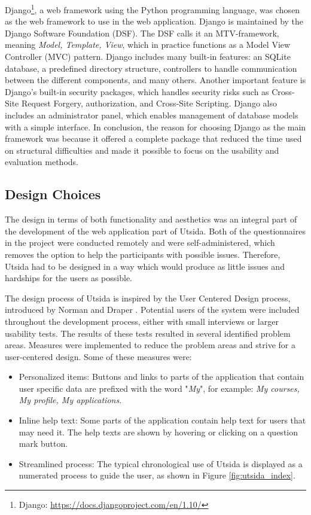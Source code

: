 Django\footnote{Django: \url{https://docs.djangoproject.com/en/1.10/}}, a web framework using the Python programming language, was chosen as the web framework to use in the web application. Django is maintained by the Django Software Foundation (DSF). The DSF calls it an MTV-framework, meaning \emph{Model, Template, View}, which in practice functions as a Model View Controller (MVC) pattern. Django includes many built-in features: an SQLite database, a predefined directory structure, controllers to handle communication between the different components, and many others. Another important feature is Django's built-in security packages, which handles security risks such as Cross-Site Request Forgery, authorization, and Cross-Site Scripting. Django also includes an administrator panel, which enables management of database models with a simple interface. In conclusion, the reason for choosing Django as the main framework was because it offered a complete package that reduced the time used on structural difficulties and made it possible to focus on the usability and evaluation methods.

\subsection{Design Choices}
The design in terms of both functionality and aesthetics was an integral part of the development of the web application part of Utsida. Both of the questionnaires in the project were conducted remotely and were self-administered, which removes the option to help the participants with possible issues. Therefore, Utsida had to be designed in a way which would produce as little issues and hardships for the users as possible.

The design process of Utsida is inspired by the User Centered Design process, introduced by Norman and Draper \cite{norman1986user}. Potential users of the system were included throughout the development process, either with small interviews or larger usability tests. The results of these tests resulted in several identified problem areas. Measures were implemented to reduce the problem areas and strive for a user-centered design. Some of these measures were:

\begin{itemize}
    \item Personalized items: Buttons and links to parts of the application that contain user specific data are prefixed with the word "\emph{My}", for example: \emph{My courses, My profile, My applications}.
    \item Inline help text: Some parts of the application contain help text for users that may need it. The help texts are shown by hovering or clicking on a question mark button. 
    \item Streamlined process: The typical chronological use of Utsida is displayed as a numerated process to guide the user, as shown in Figure \ref{fig:utsida_index}.
\end{itemize}

